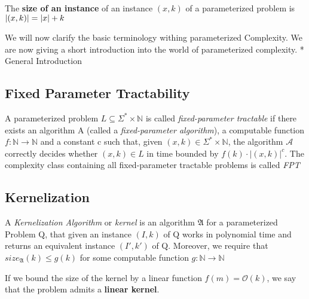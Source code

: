 \begin{definition}
    The \textbf{size of an instance} of an instance $(x,k)$ of a parameterized problem is $\abs{(x,k)} = \abs{x} + k$
\end{definition}
We will now clarify the basic terminology withing parameterized Complexity. 
We are now giving a short introduction into the world of parameterized complexity. 
* General Introduction


\subsection{Fixed Parameter Tractability}

\begin{definition} 
    A parameterized problem $L\subseteq\Sigma^*\times\mathbb{N}$ is called \textit{fixed-parameter tractable} if there exists an algorithm A (called a \textit{fixed-parameter algorithm}), a computable function $f:\mathbb{N} \rightarrow \mathbb{N}$ and a constant c such that, given $(x,k) \in \Sigma^* \times \mathbb{N}$, the algorithm $\mathcal{A}$ correctly decides whether $(x,k) \in L$ in time bounded by $f(k) \cdot |(x,k)|^c$. The complexity class containing all fixed-parameter tractable problems is called \textit{FPT}
\end{definition}


\subsection{Kernelization}

\begin{definition}
A \textit{Kernelization Algorithm} or \textit{kernel} is an algorithm $\mathfrak{A}$ for a parameterized Problem Q, that given an instance $(I,k)$ of Q works in polynomial time and returns an equivalent instance $(I', k')$ of Q. Moreover, we require that $size_{\mathfrak{A}}(k) \leq g(k)$ for some computable function $g:\mathbb{N} \rightarrow \mathbb{N}$
\end{definition}

If we bound the size of the kernel by a linear function $f(m) = \mathcal{O}(k)$, we say that the problem admits a \textbf{linear kernel}. 


